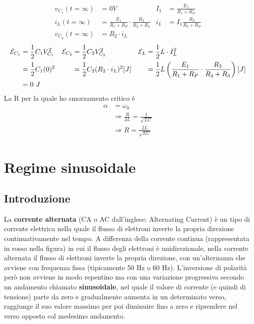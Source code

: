 \documentclass{article}
\begin{document}
\begin{enumerate}[label=\protect\circled{\arabic*}]
\begin{center}
    \end{center}
    \begin{align*}
        v_{C_1}(t=\infty) &= 0V & I_1 &= \frac{E_1}{R_1+R_P} \\ 
        i_L(t=\infty) &=\frac{E_1}{R_1+R_P}\cdot \frac{R_3}{R_2+R_3} & i_L &=I_1 \frac{R_3}{R_2+R_P} \\
        v_{C_2}(t=\infty) &= R_2\cdot i_L
    \end{align*}
    \begin{align*}
        \mathcal{E}_{C_1} &= \frac{1}{2}C_1V_{C_1}^2 & \mathcal{E}_{C_2} &= \frac{1}{2}C_2V_{C_2}^2 & \mathcal{E}_L &= \frac{1}{2}L\cdot I_L^2\\
        &=\frac{1}{2}C_1(0)^2 & &=\frac{1}{2}C_2(R_2\cdot i_L)^2 [J] & &=\frac{1}{2}L\left(\frac{E_1}{R_1+R_P}\cdot \frac{R_3}{R_2+R_3}\right) [J]\\
        &=0 \ J
    \end{align*}
    La R per la quale ho smorzamento critico è
    \begin{align*}
        \alpha &= \omega_0 \\
        &\Rightarrow \frac{R}{2L} = \frac{1}{\sqrt{LC}}\\
        &\Rightarrow R = \frac{2L}{\sqrt{LC}}
    \end{align*}
\end{enumerate}





\section{Regime sinusoidale}
\subsection{Introduzione}
La \textbf{corrente alternata} (CA o AC dall'inglese: Alternating Current) è un tipo di corrente elettrica nella quale il flusso di elettroni inverte la propria direzione continuativamente nel tempo. A differenza della corrente continua (rappresentata in rosso nella figura) in cui il flusso degli elettroni è unidirezionale, nella corrente alternata il flusso di elettroni inverte la propria direzione, con un'alternanza che avviene con frequenza fissa (tipicamente 50 Hz o 60 Hz). L'inversione di polarità però non avviene in modo repentino ma con una variazione progressiva secondo un andamento chiamato \textbf{sinusoidale}, nel quale il valore di corrente (e quindi di tensione) parte da zero e gradualmente aumenta in un determinato verso, raggiunge il suo valore massimo per poi diminuire fino a zero e riprendere nel verso opposto col medesimo andamento.
\end{document}
